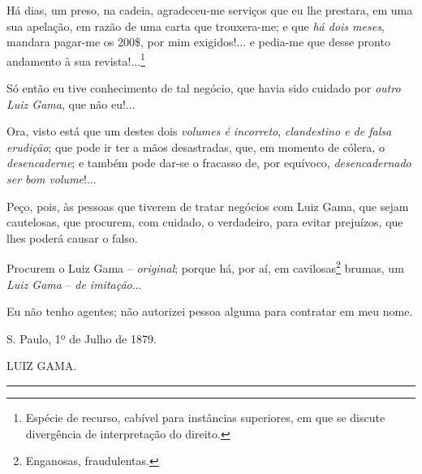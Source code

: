 Há dias, um preso, na cadeia, agradeceu-me serviços que eu lhe prestara,
em uma sua apelação, em razão de uma carta que trouxera-me; e que
\emph{há dois meses}, mandara pagar-me os 200\$, por mim exigidos!... e
pedia-me que desse pronto andamento à sua revista!...\footnote{Espécie
  de recurso, cabível para instâncias superiores, em que se discute
  divergência de interpretação do direito.}

Só então eu tive conhecimento de tal negócio, que havia sido cuidado por
\emph{outro} \emph{Luiz Gama}, que não eu!...

Ora, visto está que um destes dois \emph{volumes é incorreto},
\emph{clandestino e de falsa erudição}; que pode ir ter a mãos
desastradas, que, em momento de cólera, o \emph{desencaderne}; e também
pode dar-se o fracasso de, por equívoco, \emph{desencadernado ser bom
volume}!...

Peço, pois, às pessoas que tiverem de tratar negócios com Luiz Gama, que
sejam cautelosas, que procurem, com cuidado, o verdadeiro, para evitar
prejuízos, que lhes poderá causar o falso.

Procurem o Luiz Gama -- \emph{original}; porque há, por aí, em
cavilosas\footnote{Enganosas, fraudulentas.} brumas, um \emph{Luiz Gama}
-- \emph{de imitação}...

Eu não tenho agentes; não autorizei pessoa alguma para contratar em meu
nome.

S. Paulo, 1º de Julho de 1879.

LUIZ GAMA.

\begin{center}\rule{0.5\linewidth}{\linethickness}\end{center}
